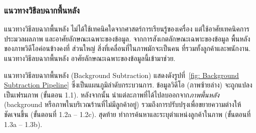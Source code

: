 \subsubsection{แนวทางวิธีลบฉากพื้นหลัง}

แนวทางวิธีลบฉากพื้นหลัง ไม่ได้ใช้เทคนิคใดจากศาสตร์การเรียนรู้ของเครื่อง
แต่ใช้อาศัยเทคนิคการประมวลผลภาพ และอาศัยลักษณะเฉพาะของข้อมูล.
%
จากการสังเกตลักษณะเฉพาะของข้อมูล
พื้นหลังของภาพวิดีโอค่อนข้างคงที่
ส่วนใหญ่ สิ่งที่เคลื่อนที่ในภาพมักจะเป็นคน ที่รวมทั้งลูกค้าและพนักงาน.
แนวทางวิธีลบฉากพื้นหลัง อาศัยลักษณะเฉพาะของข้อมูลนี้เข้ามาช่วย.

แนวทางวิธีลบฉากพื้นหลัง (Background Subtraction) 
แสดงดังรูปที่~\ref{fig: Background Subtraction Pipeline} ซึ่งเป็นแผนภูมิลำดับกระบวนการ. 
%
ข้อมูลวิดีโอ (ภาพซ้ายล่าง) จะถูกแปลงเป็นเฟรมภาพ (ขั้นตอน 1.1).
หลังจากนั้น นำแต่ละภาพที่ได้ไปลบออกจาก\textit{ภาพพื้นหลัง} (background หรือภาพในบริเวณร้านที่ไม่มีลูกค้าอยู่) รวมถึงการปรับปรุงเพื่อขยายความต่างให้ชัดเจนขึ้น (ขั้นตอนที่ 1.2a – 1.2c).
สุดท้าย ทำการค้นหาและระบุตำแหน่งลูกค้าในภาพ (ขั้นตอนที่ 1.3a – 1.3b). 

